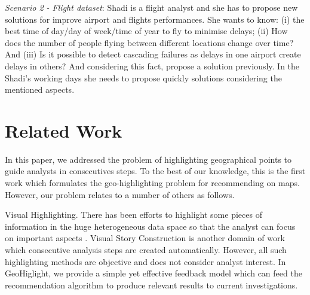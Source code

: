 \documentclass{sig-alternate-05-2015}
\begin{document}
\textit{Scenario 2 - Flight dataset}: Shadi is a flight analyst and she has to
propose new solutions for improve airport and flights performances. She wants to know:
(i) the best time of day/day of week/time of year to fly to minimise delays;
(ii) How does the number of people flying between different locations change
over time? And (iii) Is it possible to detect cascading failures as delays in
one airport create delays in others? And considering this fact, propose a
solution previously. In the Shadi's working days she needs to propose quickly
solutions considering the mentioned aspects. 

% 
% 



\section{Related Work}\label{sec:related-works}

In this paper, we addressed the problem of highlighting geographical points to
guide analysts in consecutives steps. To the best of our knowledge, this is the
first work which formulates the geo-highlighting problem for recommending on
maps. However, our problem relates to a number of others as follows.     

Visual Highlighting. There has been efforts to highlight some pieces of
information in the huge heterogeneous data space so that the analyst can focus
on important aspects \cite{Liang2010,Lohmann:2012,Robinson2011}. Visual
Story Construction is another domain of work \cite{Segel:2010,Samet:2014} which
consecutive analysis steps are created automatically. However, all such highlighting methods are objective and does not consider analyst
interest. In GeoHiglight, we provide a simple yet effective feedback model which
can feed the recommendation algorithm to produce relevant results to current
investigations.        
\end{document}

